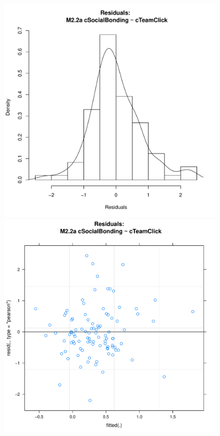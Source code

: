 {\begin{figure}[htbp]
  \includegraphics[scale =.4]{images/MLM22aHist.pdf}
  \includegraphics[scale =.4]{images/MLM22aScatter.pdf}

\end{figure}}
